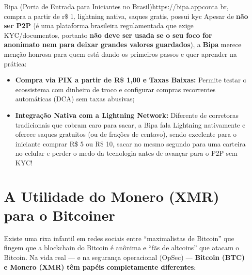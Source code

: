 \documentclass{pousadaguide}
\begin{document}
\begin{ferramenta}[logo=bipa]{Bipa (Porta de Entrada para Iniciantes no Brasil)}{https://bipa.app}{conta br, compra a partir de r\$ 1, lightning nativa, saques gratis, possui kyc}
Apesar de \textbf{não ser P2P} (é uma plataforma brasileira regulamentada que exige KYC/documentos, portanto \textbf{não deve ser usada se o seu foco for anonimato nem para deixar grandes valores guardados}), a \textbf{Bipa} merece menção honrosa para quem está dando os primeiros passos e quer aprender na prática:
\begin{itemize}
  \item \textbf{Compra via PIX a partir de R\$ 1,00 e Taxas Baixas:} Permite testar o ecossistema com dinheiro de troco e configurar compras recorrentes automáticas (DCA) sem taxas abusivas;
  \item \textbf{Integração Nativa com a Lightning Network:} Diferente de corretoras tradicionais que cobram caro para sacar, a Bipa fala Lightning nativamente e oferece saques gratuitos (ou de frações de centavo), sendo excelente para o iniciante comprar R\$ 5 ou R\$ 10, sacar no mesmo segundo para uma carteira no celular e perder o medo da tecnologia antes de avançar para o P2P sem KYC!
\end{itemize}
\end{ferramenta}

\section{A Utilidade do Monero (XMR) para o Bitcoiner}

Existe uma rixa infantil em redes sociais entre ``maximalistas de Bitcoin'' que fingem que a blockchain do Bitcoin é anônima e ``fãs de altcoins'' que atacam o Bitcoin. Na vida real — e na segurança operacional (OpSec) — \textbf{Bitcoin (BTC) e Monero (XMR) têm papéis completamente diferentes}:
\end{document}
